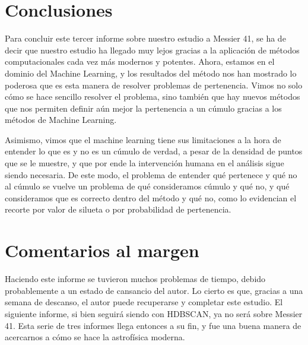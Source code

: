 \documentclass[10pt,twocolumn]{article}
\begin{document}
\section{Conclusiones}

Para concluir este tercer informe sobre nuestro estudio a Messier 41, se ha de decir que nuestro estudio ha llegado muy lejos gracias a la aplicación 
de métodos computacionales cada vez más modernos y potentes. Ahora, estamos en el dominio del Machine Learning, y los resultados del método nos han 
mostrado lo poderosa que es esta manera de resolver problemas de pertenencia. Vimos no solo cómo se hace sencillo resolver el problema, sino también
que hay nuevos métodos que nos permiten definir aún mejor la pertenencia a un cúmulo gracias a los métodos de Machine Learning. 

Asimismo, vimos que el machine learning tiene sus limitaciones a la hora de entender lo que es y no es un cúmulo de verdad, a pesar de la densidad de 
puntos que se le muestre, y que por ende la intervención humana en el análisis sigue siendo necesaria. De este modo, el problema de entender 
qué pertenece y qué no al cúmulo se vuelve un problema de qué consideramos cúmulo y qué no, y qué consideramos que es correcto dentro del método
y qué no, como lo evidencian el recorte por valor de silueta o por probabilidad de pertenencia. 

\section*{Comentarios al margen}

Haciendo este informe se tuvieron muchos problemas de tiempo, debido probablemente a un estado de cansancio del autor. 
Lo cierto es que, gracias a una semana de descanso, el autor puede recuperarse y completar este estudio. 
El siguiente informe, si bien seguirá siendo con HDBSCAN, ya no será sobre Messier 41. Esta serie de tres informes 
llega entonces a su fin, y fue una buena manera de acercarnos a cómo se hace la astrofísica moderna. 



\end{document}
